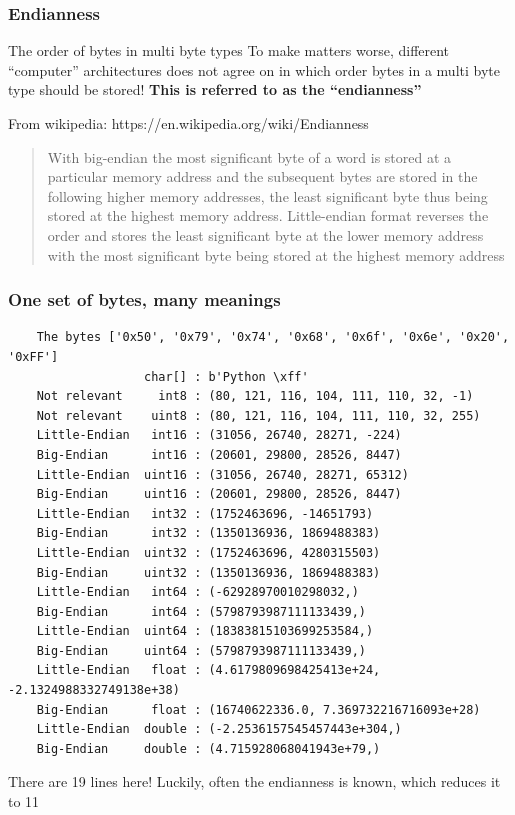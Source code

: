 \documentclass{beamer}
\begin{document}
\begin{frame}[fragile]
  \frametitle{Endianness}
  \begin{alertblock}{The order of bytes in multi byte types}
    To make matters worse, different ``computer'' architectures does
    not agree on in which order bytes in a multi byte type should be
    stored!\newline
    \newline
    \textbf{This is referred to as the ``endianness''}
  \end{alertblock}
  From wikipedia: https://en.wikipedia.org/wiki/Endianness\newline
  \begin{quotation}
    With big-endian the most significant byte of a word is stored at a
    particular memory address and the subsequent bytes are stored in
    the following higher memory addresses, the least significant byte
    thus being stored at the highest memory address. Little-endian
    format reverses the order and stores the least significant byte at
    the lower memory address with the most significant byte being
    stored at the highest memory address
  \end{quotation}
\end{frame}

\begin{frame}[fragile]
  \frametitle{One set of bytes, many meanings}
  \scriptsize
  \begin{verbatim}
    The bytes ['0x50', '0x79', '0x74', '0x68', '0x6f', '0x6e', '0x20', '0xFF']
                   char[] : b'Python \xff'
    Not relevant     int8 : (80, 121, 116, 104, 111, 110, 32, -1)
    Not relevant    uint8 : (80, 121, 116, 104, 111, 110, 32, 255)
    Little-Endian   int16 : (31056, 26740, 28271, -224)
    Big-Endian      int16 : (20601, 29800, 28526, 8447)
    Little-Endian  uint16 : (31056, 26740, 28271, 65312)
    Big-Endian     uint16 : (20601, 29800, 28526, 8447)
    Little-Endian   int32 : (1752463696, -14651793)
    Big-Endian      int32 : (1350136936, 1869488383)
    Little-Endian  uint32 : (1752463696, 4280315503)
    Big-Endian     uint32 : (1350136936, 1869488383)
    Little-Endian   int64 : (-62928970010298032,)
    Big-Endian      int64 : (5798793987111133439,)
    Little-Endian  uint64 : (18383815103699253584,)
    Big-Endian     uint64 : (5798793987111133439,)
    Little-Endian   float : (4.6179809698425413e+24, -2.1324988332749138e+38)
    Big-Endian      float : (16740622336.0, 7.369732216716093e+28)
    Little-Endian  double : (-2.2536157545457443e+304,)
    Big-Endian     double : (4.715928068041943e+79,)
  \end{verbatim}
  \normalsize
  There are 19 lines here! Luckily, often the endianness is known, which reduces it to 11
\end{frame}
\end{document}

